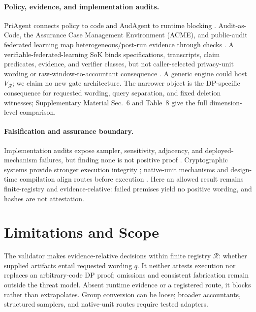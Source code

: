 \documentclass[letterpaper]{article} %
\begin{document}
\paragraph{Policy, evidence, and implementation audits.}
PriAgent connects policy to code and AudAgent to runtime blocking \citep{zhang2026priagent,zheng2026audagent}. Audit-as-Code, the Assurance Case Management Environment (ACME), and public-audit federated learning map heterogeneous/post-run evidence through checks \citep{muhammad2026audit,wei2024assurance,aljabbari2026public}. A verifiable-federated-learning SoK binds specifications, transcripts, claim predicates, evidence, and verifier classes, but not caller-selected privacy-unit wording or raw-window-to-accountant consequence \citep{rizzini2026sok}. A generic engine could host $V_{\mathcal R}$; we claim no new gate architecture. The narrower object is the DP-specific consequence for requested wording, query separation, and fixed deletion witnesses; Supplementary Material Sec.~6 and Table~8 give the full dimension-level comparison.

\paragraph{Falsification and assurance boundary.}
Implementation audits expose sampler, sensitivity, adjacency, and deployed-mechanism failures, but finding none is not positive proof \citep{tramer2022debugging,chua2024private,wang2026rethinking,cebere2026recordplay,pradhan2026beyond,chourasia2026apple}. Cryptographic systems provide stronger execution integrity \citep{shamsabadi2024confidential,abdolmaleki2026veridp}; native-unit mechanisms and design-time compilation align routes before execution \citep{chua2024mind,charles2025userlevel,schuchardt2025structured,anonymous2026compiler}. Here an allowed result remains finite-registry and evidence-relative: failed premises yield no positive wording, and hashes are not attestation.

\section{Limitations and Scope}

The validator makes evidence-relative decisions within finite registry $\mathcal R$: whether supplied artifacts entail requested wording $q$. It neither attests execution nor replaces an arbitrary-code DP proof; omissions and consistent fabrication remain outside the threat model. Absent runtime evidence or a registered route, it blocks rather than extrapolates. Group conversion can be loose; broader accountants, structured samplers, and native-unit routes require tested adapters.
\end{document}
